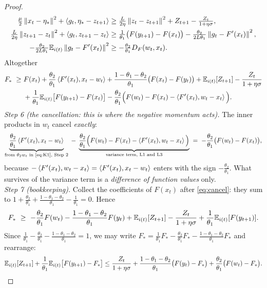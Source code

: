 \begin{proof}
\begin{align*}
\tfrac\mu2\left\|x_t-\eta_\ast\right\|^2+\left\langle g_t, \eta_\ast-z_{t+1} \right\rangle&\ge\tfrac L{2\eta}\left\|z_t-z_{t+1}\right\|^2+Z_{t+1}-\tfrac{Z_t}{1+\eta\sigma},\\
\tfrac L{2\eta}\left\|z_{t+1}-z_t\right\|^2+\left\langle g_t, z_{t+1}-z_t \right\rangle&\ge\tfrac1{\theta_1}\big(F(y_{t+1})-F(x_t)\big)-\tfrac{\theta_2}{2L\theta_1}\left\|g_t-F'(x_t)\right\|^2,\\
-\tfrac{\theta_2}{2L\theta_1}\mathbb{E}_{i(t)}\left\|g_t-F'(x_t)\right\|^2&\ge-\tfrac{\theta_2}{\theta_1}D_F(w_t,x_t).
\end{align*}
Altogether
\begin{align*}
F_\ast\ \ge\ & F(x_t)+\frac{\theta_2}{\theta_1}\left\langle F'(x_t), x_t-w_t \right\rangle+\frac{1-\theta_1-\theta_2}{\theta_1}\big(F(x_t)-F(y_t)\big)
+\mathbb{E}_{i(t)}[Z_{t+1}]-\frac{Z_t}{1+\eta\sigma}\\
&+\frac1{\theta_1}\mathbb{E}_{i(t)}\big[F(y_{t+1})-F(x_t)\big]-\frac{\theta_2}{\theta_1}\Big(F(w_t)-F(x_t)-\left\langle F'(x_t), w_t-x_t \right\rangle\Big).
\end{align*}
\emph{Step 6 (the cancellation: this is where the negative momentum acts).} The inner products in $w_t$ cancel \emph{exactly}:
\begin{equation}\label{eq:cancel}
\underbrace{\frac{\theta_2}{\theta_1}\left\langle F'(x_t), x_t-w_t \right\rangle}_{\text{from }\theta_2 w_t\text{ in \eqref{eq:K1}, Step 2}}
\;-\;\underbrace{\frac{\theta_2}{\theta_1}\Big(F(w_t)-F(x_t)-\left\langle F'(x_t), w_t-x_t \right\rangle\Big)}_{\text{variance term, L1 and L3}}
\;=\;-\frac{\theta_2}{\theta_1}\big(F(w_t)-F(x_t)\big),
\end{equation}
because $-\left\langle F'(x_t), w_t-x_t \right\rangle=\left\langle F'(x_t), x_t-w_t \right\rangle$ enters with the sign $-\frac{\theta_2}{\theta_1}$. What survives of the variance term is a \emph{difference of function values} only.\\
\emph{Step 7 (bookkeeping).} Collect the coefficients of $F(x_t)$ after \eqref{eq:cancel}: they sum to $1+\frac{\theta_2}{\theta_1}+\frac{1-\theta_1-\theta_2}{\theta_1}-\frac1{\theta_1}=0$. Hence
\begin{equation*}
F_\ast\ \ge\ -\frac{\theta_2}{\theta_1}F(w_t)-\frac{1-\theta_1-\theta_2}{\theta_1}F(y_t)+\Ei[Z_{t+1}]-\frac{Z_t}{1+\eta\sigma}+\frac1{\theta_1}\Ei[F(y_{t+1})].
\end{equation*}
Since $\frac1{\theta_1}-\frac{\theta_2}{\theta_1}-\frac{1-\theta_1-\theta_2}{\theta_1}=1$, we may write $F_\ast=\frac1{\theta_1}F_\ast-\frac{\theta_2}{\theta_1}F_\ast-\frac{1-\theta_1-\theta_2}{\theta_1}F_\ast$ and rearrange:
\begin{equation*}
\Ei[Z_{t+1}]+\frac1{\theta_1}\Ei\big[F(y_{t+1})-F_\ast\big]\le\frac{Z_t}{1+\eta\sigma}+\frac{1-\theta_1-\theta_2}{\theta_1}\big(F(y_t)-F_\ast\big)+\frac{\theta_2}{\theta_1}\big(F(w_t)-F_\ast\big).

\end{equation*}
\end{proof}
